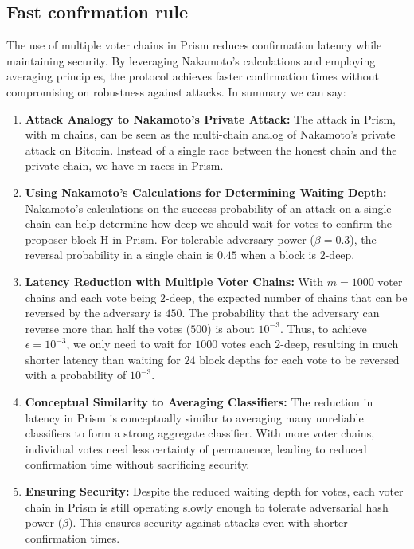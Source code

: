 \subsection{Fast confrmation rule}
The use of multiple voter chains in Prism reduces confirmation latency while maintaining security. By leveraging Nakamoto's calculations and employing averaging principles, the protocol achieves faster confirmation times without compromising on robustness against attacks. In summary we can say:
\begin{enumerate}
	\item \textbf{Attack Analogy to Nakamoto's Private Attack:} The attack in Prism, with m chains, can be seen as the multi-chain analog of Nakamoto's private attack on Bitcoin. Instead of a single race between the honest chain and the private chain, we have m races in Prism.
	\item \textbf{Using Nakamoto's Calculations for Determining Waiting Depth:} Nakamoto's calculations on the success probability of an attack on a single chain can help determine how deep we should wait for votes to confirm the proposer block H in Prism. For tolerable adversary power ($\beta = 0.3$), the reversal probability in a single chain is $0.45$ when a block is $2$-deep.
	\item \textbf{Latency Reduction with Multiple Voter Chains:} With $m = 1000$ voter chains and each vote being $2$-deep, the expected number of chains that can be reversed by the adversary is $450$. The probability that the adversary can reverse more than half the votes ($500$) is about $10^{-3}$. Thus, to achieve $\epsilon = 10^{-3}$, we only need to wait for $1000$ votes each $2$-deep, resulting in much shorter latency than waiting for $24$ block depths for each vote to be reversed with a probability of $10^{-3}$.
	\item \textbf{Conceptual Similarity to Averaging Classifiers:} The reduction in latency in Prism is conceptually similar to averaging many unreliable classifiers to form a strong aggregate classifier. With more voter chains, individual votes need less certainty of permanence, leading to reduced confirmation time without sacrificing security.
	\item \textbf{Ensuring Security:} Despite the reduced waiting depth for votes, each voter chain in Prism is still operating slowly enough to tolerate adversarial hash power ($β$). This ensures security against attacks even with shorter confirmation times.
\end{enumerate}
